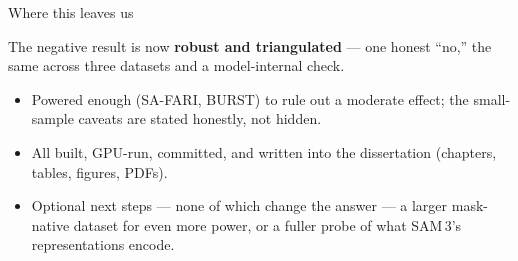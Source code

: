 \documentclass[aspectratio=169,11pt]{beamer}
\begin{document}
\begin{frame}{Where this leaves us}
  \begin{block}{}\centering\large
    The negative result is now \textbf{robust and triangulated} --- one honest ``no,'' the same across three
    datasets and a model-internal check.
  \end{block}
  \vspace{0.5em}
  \begin{itemize}\footnotesize
    \item Powered enough (SA-FARI, BURST) to rule out a moderate effect; the small-sample caveats are stated
          honestly, not hidden.
    \item All built, GPU-run, committed, and written into the dissertation (chapters, tables, figures, PDFs).
    \item Optional next steps --- none of which change the answer --- a larger mask-native dataset for even more
          power, or a fuller probe of what SAM\,3's representations encode.
  \end{itemize}
\end{frame}
\end{document}
